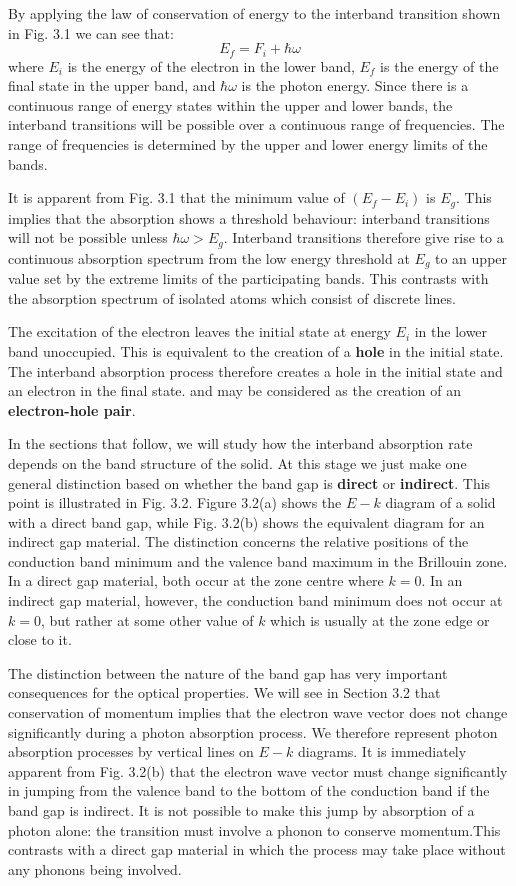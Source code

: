 \documentclass[12pt]{book}
\begin{document}
By applying the law of conservation of energy to the interband transition shown in Fig. 3.1 we can see that:
\begin{equation}\label{equa:3.1}
  E_f=F_i+\hbar\omega
\end{equation}
where $E_i$ is the energy of the electron in the lower band, $E_f$ is the energy of the final state in the upper band, and $\hbar\omega$ is the photon energy. Since there is a continuous range of energy states within the upper and lower bands, the interband transitions will be possible over a continuous range of frequencies. The range of frequencies is determined by the upper and lower energy limits of the bands.

It is apparent from Fig. 3.1 that the minimum value of $(E_f-E_i)$ is $E_g$. This implies that the absorption shows a threshold behaviour: interband transitions will not be possible unless $\hbar\omega>E_g$. Interband transitions therefore give rise to a continuous absorption spectrum from the low energy threshold at $E_g$ to an upper value set by the extreme limits of the participating bands. This contrasts with the absorption spectrum of isolated atoms which consist of discrete lines.

The excitation of the electron leaves the initial state at energy $E_i$ in the lower band unoccupied. This is equivalent to the creation of a \textbf{hole} in the initial state. The interband absorption process therefore creates a hole in the initial state and an electron in the final state. and may be considered as the creation of an \textbf{electron-hole pair}.

In the sections that follow, we will study how the interband absorption rate depends on the band structure of the solid. At this stage we just make one general distinction based on whether the band gap is \textbf{direct} or \textbf{indirect}. This point is illustrated in Fig. 3.2. Figure 3.2(a) shows the $E-k$ diagram of a solid with a direct band gap, while Fig. 3.2(b) shows the equivalent diagram for an indirect gap material. The distinction concerns the relative positions of the conduction band minimum and the valence band maximum in the Brillouin zone. In a direct gap material, both occur at the zone centre where $k = 0$. In an indirect gap material, however, the conduction band minimum does not occur at $k = 0$, but rather at some other value of $k$ which is usually at the zone edge or close to it.

The distinction between the nature of the band gap has very important consequences for the optical properties. We will see in Section 3.2 that conservation of momentum implies that the electron wave vector does not change significantly during a photon absorption process. We therefore represent photon absorption processes by vertical lines on $E-k$ diagrams. It is immediately apparent from Fig. 3.2(b) that the electron wave vector must change significantly in jumping from the valence band to the bottom of the conduction band if the band gap is indirect. It is not possible to make this jump by absorption of a photon alone: the transition must involve a phonon to conserve momentum.This contrasts with a direct gap material in which the process may take place without any phonons being involved.
\end{document}
